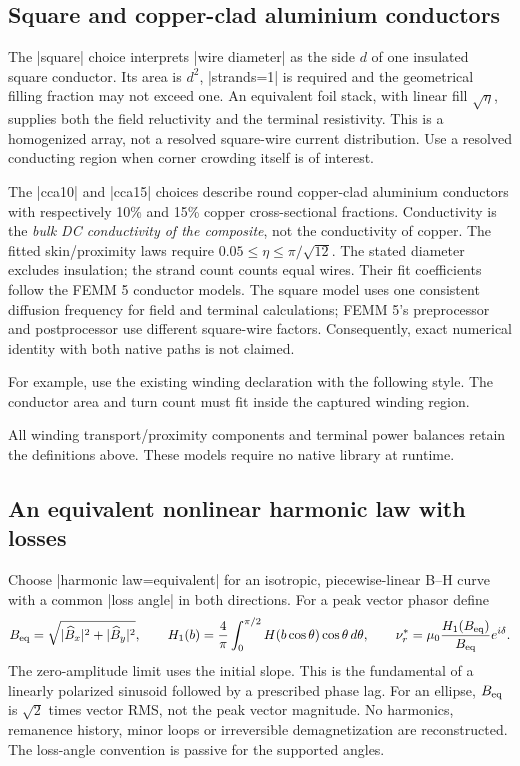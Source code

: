 \subsection{Square and copper-clad aluminium conductors}
The |square| choice interprets |wire diameter| as the side $d$ of one insulated
square conductor. Its area is $d^2$, |strands=1| is required and the geometrical
filling fraction may not exceed one. An equivalent foil stack, with linear fill
$\sqrt\eta$, supplies both the field reluctivity and the terminal resistivity.
This is a homogenized array, not a resolved square-wire current distribution.
Use a resolved conducting region when corner crowding itself is of interest.

The |cca10| and |cca15| choices describe round copper-clad aluminium conductors
with respectively 10\% and 15\% copper cross-sectional fractions. Conductivity is
the \emph{bulk DC conductivity of the composite}, not the conductivity of copper.
The fitted skin/proximity laws require $0.05\leq\eta\leq\pi/\sqrt{12}$.
The stated diameter excludes insulation; the strand count counts equal wires.
Their fit coefficients follow the FEMM 5 conductor models. The square model uses
one consistent diffusion frequency for field and terminal calculations; FEMM 5's
preprocessor and postprocessor use different square-wire factors. Consequently,
exact numerical identity with both native paths is not claimed.

For example, use the existing winding declaration with the following style.
The conductor area and turn count must fit inside the captured winding region.
\begin{codeexample}
\end{codeexample}
All winding transport/proximity components and terminal power balances retain
the definitions above. These models require no native library at runtime.

\subsection{An equivalent nonlinear harmonic law with losses}
\label{sec:equivalent-harmonic}
Choose |harmonic law=equivalent| for an isotropic, piecewise-linear B--H curve
with a common |loss angle| in both directions. For a peak vector phasor define
\[
 B_{\rm eq}=\sqrt{|\widehat B_x|^2+|\widehat B_y|^2},\qquad
 H_1(b)=\frac4\pi\int_0^{\pi/2}H(b\cos\theta)\cos\theta\,d\theta,
 \qquad \nu_r^*=\mu_0\frac{H_1(B_{\rm eq})}{B_{\rm eq}}e^{i\delta}.
\]
The zero-amplitude limit uses the initial slope. This is the fundamental of a
linearly polarized sinusoid followed by a prescribed phase lag. For an ellipse,
$B_{\rm eq}$ is $\sqrt2$ times vector RMS, not the peak vector magnitude.
No harmonics, remanence history, minor loops or irreversible demagnetization are
reconstructed. The loss-angle convention is passive for the supported angles.

